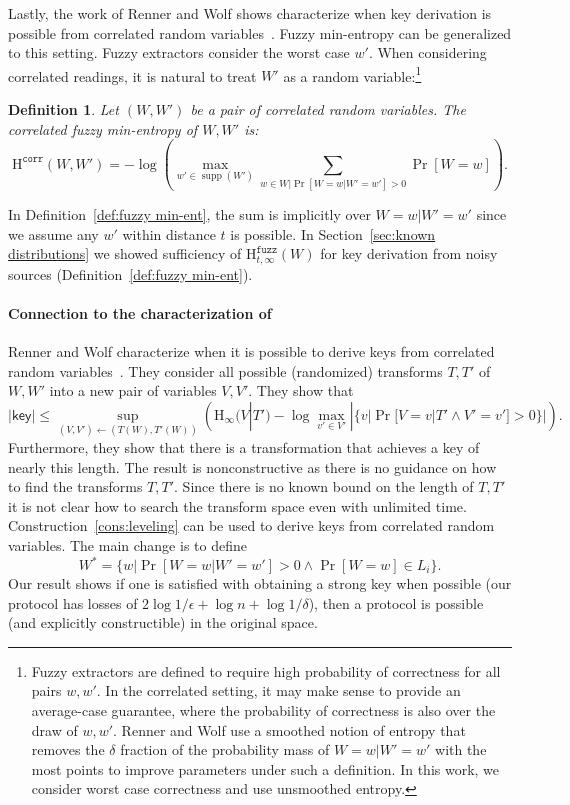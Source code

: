 \documentclass[11pt]{article}
\newcommand{\supp}{\operatorname{supp}}
\newcommand{\secref}[1]{\mbox{Section~\ref{#1}}}
\newcommand{\defref}[1]{\mbox{Definition~\ref{#1}}}
\newcommand{\consref}[1]{\mbox{Construction~\ref{#1}}}
\newcommand{\class}[1]{{\ensuremath{\mathsf{#1}}}}
\newcommand{\key}{\ensuremath{\class{key}}\xspace}
\newcommand{\Hoo}{\mathrm{H}_\infty}
\newcommand{\Hfuzz}{\mathrm{H}^{\mathtt{fuzz}}_{t,\infty}}
\newcommand{\Hcorr}{\mathrm{H}^{\mathtt{corr}}}
\newtheorem{definition}[theorem]{Definition}
\begin{document}
Lastly, the work of Renner and Wolf shows characterize when key derivation is possible from correlated random variables~\cite[Theorem 3]{DBLP:conf/asiacrypt/RennerW05}.  Fuzzy min-entropy can be generalized to this setting.   Fuzzy extractors consider the worst case $w'$.  When considering correlated readings, it is natural to treat $W'$ as a random variable:\footnote{Fuzzy extractors are defined to require high probability of correctness for all pairs $w, w'$.  In the correlated setting, it may make sense to provide an average-case guarantee, where the probability of correctness is also over the draw of $w, w'$.  Renner and Wolf use a smoothed notion of entropy that removes the $\delta$ fraction of the probability mass of $W=w|W'=w'$ with the most points to improve parameters under such a definition.  In this work, we consider worst case correctness and use unsmoothed entropy.}

\begin{definition}
\label{def:cor fuzz min}
Let $(W, W')$ be a pair of correlated random variables.  The correlated fuzzy min-entropy of $W, W'$ is:
\[\Hcorr(W, W') = -\log \left( \max_{w'\in \supp(W')}\sum_{w\in W | \Pr[W=w|W'=w']>0} \Pr[W = w] \right).\]
\end{definition}
\noindent 
In \defref{def:fuzzy min-ent}, the sum is implicitly over $W=w|W'=w'$ since we assume any $w'$ within distance $t$ is possible.  
In \secref{sec:known distributions} we showed sufficiency  of $\Hfuzz(W)$ for key derivation from noisy sources (\defref{def:fuzzy min-ent}). 

\paragraph{Connection to the characterization of~\cite{DBLP:conf/asiacrypt/RennerW05}}
Renner and Wolf characterize when it is possible to derive keys from correlated random variables~\cite[Theorem 3]{DBLP:conf/asiacrypt/RennerW05}.  They consider all possible (randomized) transforms $T, T'$ of $W, W'$ into a new pair of variables $V,V'$.  They show that \[|\key| \le \sup_{(V, V')\leftarrow (T(W), T'(W))}\left(  \Hoo(V | T') - \log \max_{v'\in V'} |\{v| \Pr[V=v|T' \wedge V'=v']>0\}|\right).\]  Furthermore, they show that there is a transformation that achieves a key of nearly this length.  The result is nonconstructive as there is no guidance on how to find the transforms $T, T'$.  Since there is no known bound on the length of $T, T'$ it is not clear how to search the transform space even with unlimited time.
\consref{cons:leveling} can be used to derive keys from correlated random variables.  The main change is to define \[W^* = \{w | \Pr[W=w | W'=w'] >0 \wedge \Pr[W=w]\in L_i\}.\]  
Our result shows if one is satisfied with obtaining a strong key when possible (our protocol has losses of $2\log 1/\epsilon + \log n+\log 1/\delta$), then a protocol is possible (and explicitly constructible) in the original space. 
\end{document}
